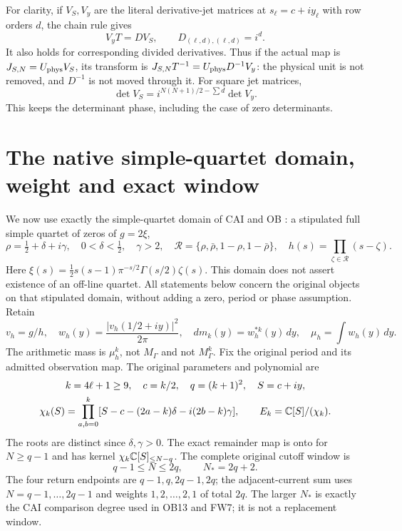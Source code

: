 \documentclass[11pt]{article}
\begin{document}
For clarity, if $V_S,V_y$ are the literal derivative-jet matrices at
$s_\ell=c+iy_\ell$ with row orders $d$, the chain rule gives
\begin{equation}\label{lgamma:eq:jets}
 V_yT=D V_S,\qquad D_{(\ell,d),(\ell,d)}=i^d.
\end{equation}
It also holds for corresponding divided derivatives.  Thus if the
actual map is $J_{S,N}=U_{\rm phys}V_S$, its transform is
$J_{S,N}T^{-1}=U_{\rm phys}D^{-1}V_y$: the physical unit is not removed,
and $D^{-1}$ is not moved through it.  For square jet matrices,
\[
 \det V_S=i^{N(N+1)/2-\sum d}\det V_y.
\]
This keeps the determinant phase, including the case of zero determinants.

\section{The native simple-quartet domain, weight and exact window}

We now use exactly the simple-quartet domain of CAI and OB
\cite{lgamma:CAI,lgamma:OB}: a stipulated full simple quartet of zeros of $g=2\xi$,
\begin{equation}\label{lgamma:eq:nativedomain}
 \rho=\tfrac12+\delta+i\gamma,\quad 0<\delta<\tfrac12,\quad\gamma>2,
 \quad \mathcal R=\{\rho,\bar\rho,1-\rho,1-\bar\rho\},
 \quad h(s)=\prod_{\zeta\in\mathcal R}(s-\zeta).
\end{equation}
Here $\xi(s)=\tfrac12s(s-1)\pi^{-s/2}\Gamma(s/2)\zeta(s)$.
This domain does not assert existence of an off-line quartet.
All statements below concern the original objects on that stipulated
domain, without adding a zero, period or phase assumption.
Retain
\begin{equation}\label{lgamma:eq:nativeweight}
 v_h=g/h,\quad w_h(y)=\frac{|v_h(1/2+iy)|^2}{2\pi},\quad
 dm_k(y)=w_h^{*k}(y)\,dy,\quad
 \mu_h=\int w_h(y)\,dy.
\end{equation}
The arithmetic mass is $\mu_h^k$, not $M_\Gamma$ and not
$M_\Gamma^k$.  Fix the original period and its admitted observation map.
The original parameters and polynomial are
\begin{equation}\label{lgamma:eq:chik}
 \begin{gathered}
 k=4\ell+1\ge9,\quad c=k/2,\quad q=(k+1)^2,\quad S=c+iy,\\
 \chi_k(S)=\prod_{a,b=0}^k
 [S-c-(2a-k)\delta-i(2b-k)\gamma],\qquad E_k=\mathbb C[S]/(\chi_k).
 \end{gathered}
\end{equation}
The roots are distinct since $\delta,\gamma>0$.  The exact remainder map
is onto for $N\ge q-1$ and has kernel $\chi_k\mathbb C[S]_{\le N-q}$.
The complete original cutoff window is
\begin{equation}\label{lgamma:eq:window}
 q-1\le N\le2q,
 \qquad N_*=2q+2.
\end{equation}
The four return endpoints are $q-1,q,2q-1,2q$; the adjacent-current sum
uses $N=q-1,\ldots,2q-1$ and weights $1,2,\ldots,2,1$ of total $2q$.
The larger $N_*$ is exactly the CAI comparison degree used in OB13 and
FW7; it is not a replacement window.
\end{document}
